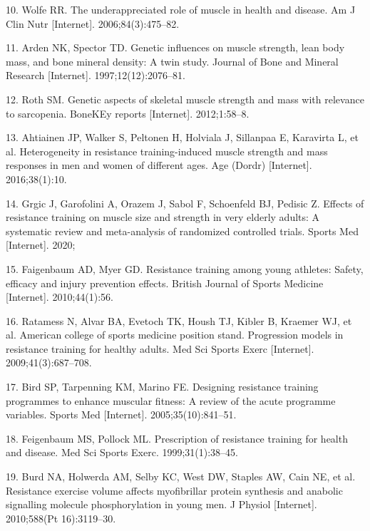 \documentclass[twoside,10pt]{gihclass} %
\begin{document}
\leavevmode\hypertarget{ref-RN763}{}%
10. Wolfe RR. The underappreciated role of muscle in health and disease. Am J Clin Nutr {[}Internet{]}. 2006;84(3):475--82.

\leavevmode\hypertarget{ref-RN2526}{}%
11. Arden NK, Spector TD. Genetic influences on muscle strength, lean body mass, and bone mineral density: A twin study. Journal of Bone and Mineral Research {[}Internet{]}. 1997;12(12):2076--81.

\leavevmode\hypertarget{ref-RN2527}{}%
12. Roth SM. Genetic aspects of skeletal muscle strength and mass with relevance to sarcopenia. BoneKEy reports {[}Internet{]}. 2012;1:58--8.

\leavevmode\hypertarget{ref-RN1741}{}%
13. Ahtiainen JP, Walker S, Peltonen H, Holviala J, Sillanpaa E, Karavirta L, et al. Heterogeneity in resistance training-induced muscle strength and mass responses in men and women of different ages. Age (Dordr) {[}Internet{]}. 2016;38(1):10.

\leavevmode\hypertarget{ref-RN2534}{}%
14. Grgic J, Garofolini A, Orazem J, Sabol F, Schoenfeld BJ, Pedisic Z. Effects of resistance training on muscle size and strength in very elderly adults: A systematic review and meta-analysis of randomized controlled trials. Sports Med {[}Internet{]}. 2020;

\leavevmode\hypertarget{ref-RN2536}{}%
15. Faigenbaum AD, Myer GD. Resistance training among young athletes: Safety, efficacy and injury prevention effects. British Journal of Sports Medicine {[}Internet{]}. 2010;44(1):56.

\leavevmode\hypertarget{ref-RN1}{}%
16. Ratamess N, Alvar BA, Evetoch TK, Housh TJ, Kibler B, Kraemer WJ, et al. American college of sports medicine position stand. Progression models in resistance training for healthy adults. Med Sci Sports Exerc {[}Internet{]}. 2009;41(3):687--708.

\leavevmode\hypertarget{ref-RN798}{}%
17. Bird SP, Tarpenning KM, Marino FE. Designing resistance training programmes to enhance muscular fitness: A review of the acute programme variables. Sports Med {[}Internet{]}. 2005;35(10):841--51.

\leavevmode\hypertarget{ref-RN2538}{}%
18. Feigenbaum MS, Pollock ML. Prescription of resistance training for health and disease. Med Sci Sports Exerc. 1999;31(1):38--45.

\leavevmode\hypertarget{ref-RN791}{}%
19. Burd NA, Holwerda AM, Selby KC, West DW, Staples AW, Cain NE, et al. Resistance exercise volume affects myofibrillar protein synthesis and anabolic signalling molecule phosphorylation in young men. J Physiol {[}Internet{]}. 2010;588(Pt 16):3119--30.
\end{document}
